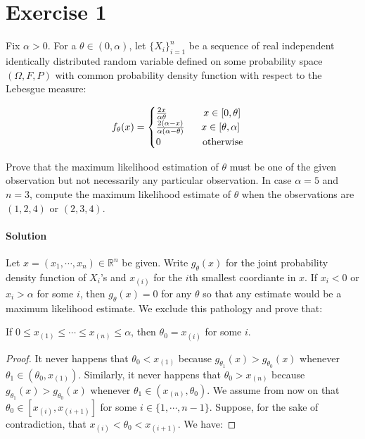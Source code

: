 \documentclass[../main.tex]{subfiles}
\begin{document}
\section{Exercise 1}
\begin{CJK*}{UTF8}{gbsn}
Fix $\alpha > 0$. For a $\theta \in (0, \alpha)$,
let $\{X_i\}_{i=1}^n$ be a sequence of real independent identically distributed random variable 
defined on some probability space $(\Omega, F, P)$
with common probability density function with respect to the Lebesgue measure:

\begin{equation*}
    f_{\theta}(x) = 
    \begin{cases}
        \frac{2x}{\alpha \theta} \tab[1.3cm] x \in [0, \theta] \\
        \frac{2(\alpha-x)}{\alpha(\alpha - \theta)} \tab[0.6cm] x \in [\theta, \alpha] \\
        0 \tab[1.5cm] \text{otherwise}
    \end{cases}
\end{equation*}

Prove that the maximum likelihood estimation of $\theta$ must be one of the given observation
but not necessarily any particular observation. 
In case $\alpha = 5$ and $n=3$, compute the maximum likelihood estimate of $\theta$ when the 
observations are $(1,2,4)$ or $(2,3,4)$.  

\smallskip
\paragraph{Solution}
Let $x = (x_1, \cdots, x_n) \in \mathbb{R}^n$ be given. 
Write $g_{\theta}(x)$ for the joint probability density function of $X_i$'s 
and $x_{(i)}$ for the $i$th smallest coordiante in $x$.
If $x_i < 0$ or $x_i > \alpha$ for some $i$, then $g_{\theta}(x)=0$ for any $\theta$ so that 
any estimate would be a maximum likelihood estimate.
We exclude this pathology and prove that:

\begin{theorem}
If $0 \leqslant x_{(1)} \leqslant \cdots \leqslant x_{(n)} \leqslant \alpha$, then $\theta_0 = x_{(i)}$ for some $i$.
\end{theorem}

\begin{proof}
It never happens that $\theta_0 < x_{(1)}$
because $g_{\theta_1}(x) > g_{\theta_0}(x)$ whenever $\theta_1 \in (\theta_0,x_{(1)})$.
Similarly, it never happens that $\theta_0 > x_{(n)}$ because
$g_{\theta_1}(x) > g_{\theta_0}(x)$ whenever $\theta_1 \in (x_{(n)}, \theta_0)$.
We assume from now on that $\theta_0 \in [x_{(i)}, x_{(i+1)}]$ for some $i \in \{1,\cdots, n-1\}$.
Suppose, for the sake of contradiction, that $x_{(i)} < \theta_0 < x_{(i+1)}$. We have:


\end{proof}
\end{CJK*}
\end{document}
